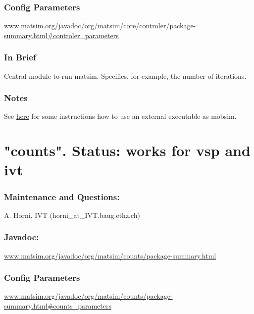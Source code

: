 \documentclass[a4paper,11pt]{report}
\begin{document}
\subsubsection{Config Parameters}

\href{http://www.matsim.org/javadoc/org/matsim/core/controler/package-summary.html#controler_parameters}{www.matsim.org/javadoc/org/matsim/core/controler/package-summary.html\#controler\_parameters}


\subsubsection{\textbf{\textbf{In Brief}}}

Central module to run matsim. Specifies, for example, the number of iterations.



\subsubsection{Notes}

See \href{http://matsim.org/node/398}{here} for some instructions how to use an external executable as mobsim.

\vfill\eject
\section{"counts". Status: works for vsp and ivt}

\subsubsection{\textbf{Maintenance and Questions:}}

A. Horni, IVT (horni\_at\_IVT.baug.ethz.ch)

\subsubsection{\textbf{\textbf{Javadoc:
\\}}}

\href{http://www.matsim.org/javadoc/org/matsim/counts/package-summary.html}{www.matsim.org/javadoc/org/matsim/counts/package-summary.html}


\subsubsection{\textbf{\textbf{Config Parameters{}}}}

\href{http://www.matsim.org/javadoc/org/matsim/counts/package-summary.html#counts_parameters}{www.matsim.org/javadoc/org/matsim/counts/package-summary.html\#counts\_parameters}
\end{document}
